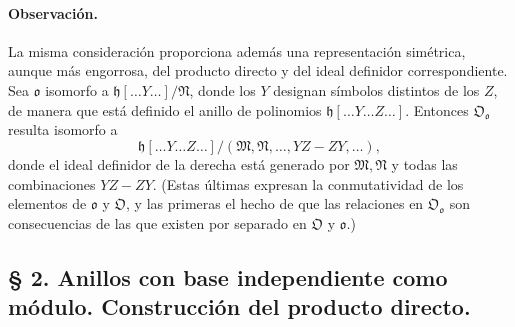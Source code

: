 \paragraph{Observación.}
La misma consideración proporciona además una representación simétrica, aunque más engorrosa, del producto directo y del ideal definidor correspondiente. Sea $\mathfrak o$ isomorfo a $\mathfrak h[\ldots Y\ldots]/\mathfrak N$, donde los $Y$ designan símbolos distintos de los $Z$, de manera que está definido el anillo de polinomios $\mathfrak h[\ldots Y\ldots Z\ldots]$. Entonces $\mathfrak O_{\mathfrak o}$ resulta isomorfo a
\[
\mathfrak h[\ldots Y\ldots Z\ldots]/(\mathfrak M,\mathfrak N,\ldots,YZ-ZY,\ldots),
\]
donde el ideal definidor de la derecha está generado por $\mathfrak M,\mathfrak N$ y todas las combinaciones $YZ-ZY$. (Estas últimas expresan la conmutatividad de los elementos de $\mathfrak o$ y $\mathfrak O$, y las primeras el hecho de que las relaciones en $\mathfrak O_{\mathfrak o}$ son consecuencias de las que existen por separado en $\mathfrak O$ y $\mathfrak o$.)
\subsection*{§ 2. Anillos con base independiente como módulo. Construcción del producto directo.}

